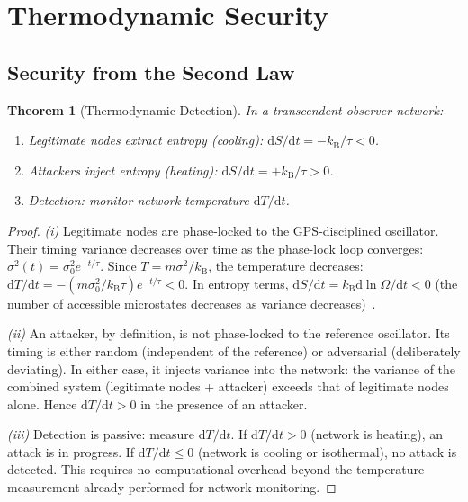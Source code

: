 \documentclass[11pt,twocolumn,a4paper]{article}
\newtheorem{theorem}{Theorem}[section]
\theoremstyle{definition}
\newcommand{\kB}{k_{\mathrm{B}}}
\newcommand{\dif}{\mathrm{d}}
\begin{document}
\section{Thermodynamic Security}\label{sec:security}

\subsection{Security from the Second Law}\label{sec:security:second_law}

\begin{theorem}[Thermodynamic Detection]\label{thm:thermo_detection}
In a transcendent observer network:
\begin{enumerate}[label=(\roman*)]
  \item Legitimate nodes extract entropy (cooling): $\dif S/\dif t = -\kB/\tau < 0$.
  \item Attackers inject entropy (heating): $\dif S/\dif t = +\kB/\tau > 0$.
  \item Detection: monitor network temperature $\dif T/\dif t$.
\end{enumerate}
\end{theorem}

\begin{proof}
\emph{(i)} Legitimate nodes are phase-locked to the GPS-disciplined oscillator. Their
timing variance decreases over time as the phase-lock loop converges:
$\sigma^2(t) = \sigma^2_0 e^{-t/\tau}$. Since $T = m\sigma^2/\kB$, the temperature
decreases: $\dif T/\dif t = -(m\sigma^2_0/\kB\tau)e^{-t/\tau} < 0$. In entropy terms,
$\dif S/\dif t = \kB \dif\ln\Omega/\dif t < 0$ (the number of accessible microstates
decreases as variance decreases)~\cite{sachikonye2025a}.

\emph{(ii)} An attacker, by definition, is not phase-locked to the reference oscillator.
Its timing is either random (independent of the reference) or adversarial (deliberately
deviating). In either case, it injects variance into the network: the variance of the
combined system (legitimate nodes + attacker) exceeds that of legitimate nodes alone.
Hence $\dif T/\dif t > 0$ in the presence of an attacker.

\emph{(iii)} Detection is passive: measure $\dif T/\dif t$. If $\dif T/\dif t > 0$
(network is heating), an attack is in progress. If $\dif T/\dif t \leq 0$ (network is
cooling or isothermal), no attack is detected. This requires no computational overhead
beyond the temperature measurement already performed for network monitoring.
\end{proof}
\end{document}
